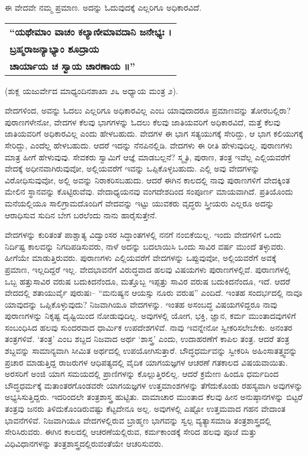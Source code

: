 \vskip 4pt

ಈ ವೇದವೇ ನಮ್ಮ ಪ್ರಮಾಣ. ಅದನ್ನು ಓದುವುದಕ್ಕೆ ಎಲ್ಲರಿಗೂ ಅಧಿಕಾರವಿದೆ.

\smallskip

\begin{longtable}{@{\hspace{-10pt}}l@{}}
\textbf{“ಯಥೇಮಾಂ ವಾಚಂ ಕಲ್ಯಾಣೀಮಾವದಾನಿ ಜನೇಭ್ಯಃ ।} \\
\textbf{ಬ್ರಹ್ಮರಾಜನ್ಯಾಭ್ಯಾಂ ಶೂದ್ರಾಯ} \\
\textbf{ಚಾರ್ಯಾಯ ಚ ಸ್ವಾಯ ಚಾರಣಾಯ ॥”} \\
\end{longtable}

\hfill (ಶುಕ್ಲ ಯಜುರ್ವೇದ ಮಾಧ್ಯಂದಿನಶಾಖಾ ೨೬ ಅಧ್ಯಾಯ ಮಂತ್ರ ೨).

\smallskip

ವೇದಗಳಿಂದ, ಅವನ್ನು ಓದಲು ಎಲ್ಲರಿಗೂ ಅಧಿಕಾರವಿಲ್ಲ ಎಂಬ ಯಾವುದಾದರೂ ಪ್ರಮಾಣವನ್ನು ತೋರಬಲ್ಲಿರಾ? ಪುರಾಣಗಳೇನೋ, ವೇದಗಳ ಕೆಲವು ಭಾಗಗಳನ್ನು ಓದಲು ಕೆಲವು ಜಾತಿಯವರಿಗೆ ಅಧಿಕಾರವಿದೆ, ಮತ್ತೆ ಕೆಲವು ಜಾತಿಯವರಿಗೆ ಅಧಿಕಾರವಿಲ್ಲ ಎಂದು ಹೇಳಬಹುದು. ವೇದಗಳ ಈ ಭಾಗ ಸತ್ಯಯುಗಕ್ಕೆ ಸೇರಿದ್ದು, ಆ ಭಾಗ ಕಲಿಯುಗಕ್ಕೆ ಸೇರಿದ್ದು, ಎಂದೆಲ್ಲ ಹೇಳಬಹುದು. ಆದರೆ ಇದನ್ನು ನೆನಪಿನಲ್ಲಿಡಿ. ವೇದಗಳು ಈ ರೀತಿ ಹೇಳುವುದಿಲ್ಲ. ಪುರಾಣಗಳು ಮಾತ್ರ ಹೀಗೆ ಹೇಳುವುವು. ಸೇವಕರು ಸ್ವಾಮಿಗೆ ಆಜ್ಞೆ ಮಾಡಬಲ್ಲನೆ? ಸ್ಮೃತಿ, ಪುರಾಣ, ತಂತ್ರ ಇವೆಲ್ಲ ಎಲ್ಲಿಯವರೆಗೆ ವೇದಕ್ಕೆ ಅಧೀನವಾಗಿರುವುವೋ, ಅಲ್ಲಿಯವರೆಗೆ ಇವನ್ನು ಒಪ್ಪಿಕೊಳ್ಳಬಹುದು. ಎಲ್ಲಿ ಅವು ವೇದಗಳನ್ನು ವಿರೋಧಿಸುವುವೋ, ಅಲ್ಲಿ ಅವನ್ನು ನಿರಾಕರಿಸಬಹುದು. ಆದರೆ ಈಗಿನ ಕಾಲದಲ್ಲಿ ನಾವು ಪುರಾಣಗಳಿಗೆ ವೇದಕ್ಕಿಂತ ಮೇಲಿನ ಸ್ಥಾನವನ್ನು ಕೊಟ್ಟಿರುವೆವು. ವೇದಾಧ್ಯಯನವು ವಂಗದೇಶದಿಂದ ಸಂಪೂರ್ಣ ಮಾಯವಾಗಿದೆ. ಪ್ರತಿಯೊಂದು ಮನೆಯಲ್ಲಿಯೂ ಸಾಲಿಗ್ರಾಮದೊಂದಿಗೆ ವೇದವನ್ನು ಇಟ್ಟು ಯುವಕರು ವೃದ್ಧರು ಸ್ತ್ರೀಯರು ಎಲ್ಲರೂ ಅದನ್ನು ಆರಾಧಿಸುವ ಸುದಿನ ಬೇಗ ಬರಲೆಂದು ನಾನು ಹಾರೈಸುತ್ತೇನೆ.

\vskip 4pt

ವೇದಗಳನ್ನು ಕುರಿತಂತೆ ಪಾಶ್ಚಾತ್ಯ ವಿದ್ವಾಂಸರ ಸಿದ್ಧಾಂತಗಳಲ್ಲಿ ನನಗೆ ನಂಬಿಕೆಯಿಲ್ಲ. ಇಂದು ವೇದಗಳಿಗೆ ಒಂದು ನಿರ್ದಿಷ್ಟ ಕಾಲವನ್ನು ನಿಗದಿಪಡಿಸುವರು, ನಾಳೆ ಅದನ್ನು ಬದಲಾಯಿಸಿ ಒಂದು ಸಾವಿರ ವರ್ಷ ಮುಂದೆ ತಳ್ಳುವರು. ಹೀಗೆಯೇ ಮಾಡುತ್ತಿರುವರು. ಪುರಾಣಗಳು ಎಲ್ಲಿಯವರೆಗೆ ವೇದಗಳನ್ನು ಒಪ್ಪುವುವೋ, ಅಲ್ಲಿಯವರೆಗೆ ಅವಕ್ಕೆ ಪ್ರಮಾಣ, ಇಲ್ಲದಿದ್ದರೆ ಇಲ್ಲ. ವೇದಭಾವನೆಗೆ ವಿರುದ್ಧವಾದ ಹಲವು ವಿಷಯಗಳು ಪುರಾಣಗಳಲ್ಲಿವೆ. ಪುರಾಣಗಳಲ್ಲಿ ಒಬ್ಬ ಹತ್ತುಸಾವಿರ ವರುಷ ಬದುಕಿದನೆಂದೂ, ಮತ್ತೊಬ್ಬ ಇಪ್ಪತ್ತು ಸಾವಿರ ವರುಷ ಬದುಕಿದನೆಂದೂ, ಇದೆ. ಆದರೆ ವೇದದಲ್ಲಿ ಶತಾಯುರ್ವೈ ಪುರುಷಃ– “ಮನುಷ್ಯನ ಆಯಸ್ಸು ನೂರು ವರುಷ” ಎಂದಿದೆ. ಇಂತಹ ಸಂದರ್ಭದಲ್ಲಿ ನಾವೂ ಯಾವುದನ್ನು ಒಪ್ಪಿಕೊಳ್ಳುವುದು? ನಿಜವಾಗಿಯೂ ವೇದಗಳನ್ನು. ಇಂತಹ ಅಸಂಬದ್ಧ ವಿಷಯಗಳಿದ್ದರೂ ನಾವು ಪುರಾಣಗಳನ್ನು ನಿಕೃಷ್ಟ ದೃಷ್ಟಿಯಿಂದ ನೋಡುವುದಿಲ್ಲ. ಅವುಗಳಲ್ಲಿ ಯೋಗ, ಭಕ್ತಿ, ಜ್ಞಾನ, ಕರ್ಮ ಮುಂತಾದವುಗಳಿಗೆ ಸಂಬಂಧಿಸಿದ ಹಲವು ಸುಂದರವಾದ ಧಾರ್ಮಿಕ ಉಪದೇಶಗಳಿವೆ. ನಾವು ಇವನ್ನೇನೋ ಸ್ವೀಕರಿಸಲೇಬೇಕು. ಅನಂತರ ತಂತ್ರಗಳಿವೆ. ‘ತಂತ್ರ’ ಎಂಬ ಶಬ್ದದ ನಿಜವಾದ ಅರ್ಥ ‘ಶಾಸ್ತ್ರ’ ಎಂದು, ಉದಾಹರಣೆಗೆ ಕಾಪಿಲ ತಂತ್ರ. ಆದರೆ ತಂತ್ರ ಶಬ್ದವನ್ನು ಸಾಮಾನ್ಯವಾಗಿ ಸೀಮಿತ ಅರ್ಥದಲ್ಲಿ ಉಪಯೋಗಿಸುತ್ತಾರೆ. ಬೌದ್ಧಧರ್ಮವನ್ನು ಸ್ವೀಕರಿಸಿ ಅಹಿಂಸಾತತ್ತ್ವವನ್ನು ಪ್ರಚಾರ ಮಾಡುತ್ತಿದ್ದ ರಾಜರುಗಳ ಆಧಿಪತ್ಯದಲ್ಲಿ ವೈದಿಕ ಯಾಗಯಜ್ಞಗಳ ಆಚರಣೆ ಗತಕಾಲದ ವಿಷಯವಾಯಿತು. ಅರಸರಿಗೆ ಅಂಜಿ ಯಾಗ ಸಮಯದಲ್ಲಿ ಪ್ರಾಣಿಗಳನ್ನು ಕೊಲ್ಲುತ್ತಿರಲಿಲ್ಲ. ಆದರೆ ಕ್ರಮೇಣ ಹಿಂದೂ ಧರ್ಮದಿಂದ ಬೌದ್ಧಧರ್ಮಕ್ಕೆ ಮತಾಂತರಗೊಂಡವರೇ ಯಾಗಯಜ್ಞಗಳ ಉತ್ತಮಾಂಶಗಳನ್ನು ತೆಗೆದುಕೊಂಡು ರಹಸ್ಯವಾಗಿ ಅವುಗಳನ್ನು ಅಭ್ಯಸಿಸುತ್ತಿದ್ದರು. ಇದರಿಂದಲೇ ತಂತ್ರಶಾಸ್ತ್ರ ಹುಟ್ಟಿತು. ವಾಮಾಚಾರ ಮುಂತಾದ ಕೆಲವು ಹೀನ ಅನುಷ್ಠಾನಗಳನ್ನು ಬಿಟ್ಟರೆ ತಂತ್ರವು ಜನರು ತಿಳಿದುಕೊಂಡಿರುವಷ್ಟು ಕೆಟ್ಟದೇನೂ ಅಲ್ಲ. ಅವುಗಳಲ್ಲಿ ಎಷ್ಟೋ ಉತ್ತಮವಾದ ಗಹನ ವೇದಾಂತ ಭಾವನೆಗಳಿವೆ. ನಿಜವಾಗಿಯೂ ವೇದಗಳಲ್ಲಿರುವ ಬ್ರಾಹ್ಮಣ ಭಾಗವನ್ನು ಸ್ವಲ್ಪ ವ್ಯತ್ಯಾಸಮಾಡಿ ತಂತ್ರಶಾಸ್ತ್ರದಲ್ಲಿ ಸೇರಿಸಿರುವರು. ಈಗಿನ ಕಾಲದಲ್ಲಿ ಆಚರಣೆಯಲ್ಲಿರುವ, ಕರ್ಮಕಾಂಡಕ್ಕೆ ಸೇರಿದ ಹಲವು ಪೂಜೆ ಮತ್ತು ವಿಧಿವಿಧಾನಗಳನ್ನು ತಂತ್ರಶಾಸ್ತ್ರದಲ್ಲಿರುವಂತೆಯೇ ಆಚರಿಸುವರು.


